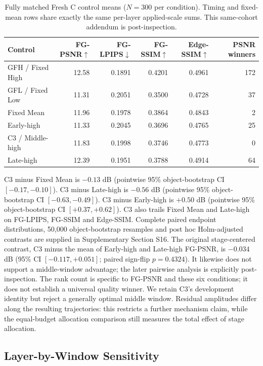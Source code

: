 \documentclass[times,twocolumn,final]{elsarticle}
\begin{document}
\begin{table}[t]
\centering\scriptsize\setlength{\tabcolsep}{4pt}
\caption{Fully matched Fresh C control means ($N=300$ per condition). Timing and fixed-mean rows share exactly the same per-layer applied-scale sums. This same-cohort addendum is post-inspection.}
\label{tab:matched-budget300}
\begin{tabular}{lrrrrr}
\toprule
Control & FG-PSNR$\uparrow$ & FG-LPIPS$\downarrow$ & FG-SSIM$\uparrow$ & Edge-SSIM$\uparrow$ & PSNR winners \\
\midrule
GFH / Fixed High & 12.58 & 0.1891 & 0.4201 & 0.4961 & 172 \\
GFL / Fixed Low & 11.31 & 0.2051 & 0.3500 & 0.4728 & 37 \\
Fixed Mean & 11.96 & 0.1978 & 0.3864 & 0.4843 & 2 \\
Early-high & 11.33 & 0.2045 & 0.3696 & 0.4765 & 25 \\
C3 / Middle-high & 11.83 & 0.1998 & 0.3746 & 0.4773 & 0 \\
Late-high & 12.39 & 0.1951 & 0.3788 & 0.4914 & 64 \\
\bottomrule
\end{tabular}
\end{table}

C3 minus Fixed Mean is $-0.13$ dB (pointwise 95\% object-bootstrap CI $[-0.17,-0.10]$). C3 minus Late-high is $-0.56$ dB (pointwise 95\% object-bootstrap CI $[-0.63,-0.49]$). C3 minus Early-high is $+0.50$ dB (pointwise 95\% object-bootstrap CI $[+0.37,+0.62]$). C3 also trails Fixed Mean and Late-high on FG-LPIPS, FG-SSIM and Edge-SSIM. Complete paired endpoint distributions, 50,000 object-bootstrap resamples and post hoc Holm-adjusted contrasts are supplied in Supplementary Section S16. The original stage-centered contrast, C3 minus the mean of Early-high and Late-high FG-PSNR, is $-0.034$ dB (95\% CI $[-0.117,+0.051]$; paired sign-flip $p=0.4324$). It likewise does not support a middle-window advantage; the later pairwise analysis is explicitly post-inspection. The rank count is specific to FG-PSNR and these six conditions; it does not establish a universal quality winner. We retain C3's development identity but reject a generally optimal middle window. Residual amplitudes differ along the resulting trajectories: this restricts a further mechanism claim, while the equal-budget allocation comparison still measures the total effect of stage allocation.

\subsection{Layer-by-Window Sensitivity}
\label{subsec:layerwindow}
\end{document}
